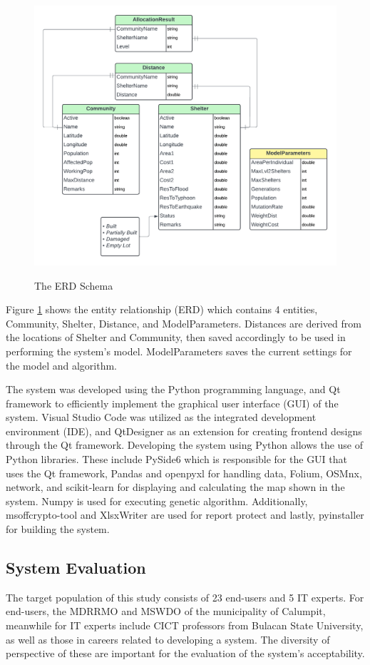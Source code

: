 \documentclass[11pt,letterpaper,]{article}
\begin{document}
	\begin{figure}[h!]
		\caption{The ERD Schema}
		\centering
		\includegraphics[width=0.6\columnwidth]{ERD}
		\label{ERD}
	\end{figure}
	Figure \ref{ERD} shows the entity relationship (ERD) which contains 4 entities, Community, Shelter, Distance, and ModelParameters. Distances are derived from the locations of Shelter and Community, then saved accordingly to be used in performing the system’s model. ModelParameters saves the current settings for the model and algorithm.
	
	The system was developed using the Python programming language, and Qt framework to efficiently implement the graphical user interface (GUI) of the system. Visual Studio Code was utilized as the integrated development environment (IDE), and QtDesigner as an extension for creating frontend designs through the Qt framework.
	Developing the system using Python allows the use of Python libraries. These include PySide6 which is responsible for the GUI that uses the Qt framework, Pandas and openpyxl for handling data, Folium, OSMnx, network, and scikit-learn for displaying and calculating the map shown in the system. Numpy is used for executing genetic algorithm. Additionally, msoffcrypto-tool and XlsxWriter are used for report protect and lastly, pyinstaller for building the system.
	
	
	\subsection{System Evaluation}
	
	The target population of this study consists of 23 end-users and 5 IT experts. For end-users, the MDRRMO and MSWDO of the municipality of Calumpit, meanwhile for IT experts include CICT professors from Bulacan State University, as well as those in careers related to developing a system. The diversity of perspective of these are important for the evaluation of the system’s acceptability.
	
\end{document}
